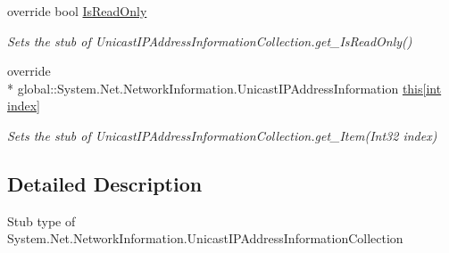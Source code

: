 \begin{DoxyCompactItemize}
override bool \hyperlink{class_system_1_1_net_1_1_network_information_1_1_fakes_1_1_stub_unicast_i_p_address_information_collection_a89823fd53fce75ec8566ccff898876a0}{Is\-Read\-Only}
\begin{DoxyCompactList}\small\item\em Sets the stub of Unicast\-I\-P\-Address\-Information\-Collection.\-get\-\_\-\-Is\-Read\-Only()\end{DoxyCompactList}\item 
override \\*
global\-::\-System.\-Net.\-Network\-Information.\-Unicast\-I\-P\-Address\-Information \hyperlink{class_system_1_1_net_1_1_network_information_1_1_fakes_1_1_stub_unicast_i_p_address_information_collection_a4756dc416de6add73ab9260c2d71fe17}{this\mbox{[}int index\mbox{]}}
\begin{DoxyCompactList}\small\item\em Sets the stub of Unicast\-I\-P\-Address\-Information\-Collection.\-get\-\_\-\-Item(\-Int32 index)\end{DoxyCompactList}\end{DoxyCompactItemize}


\subsection{Detailed Description}
Stub type of System.\-Net.\-Network\-Information.\-Unicast\-I\-P\-Address\-Information\-Collection



